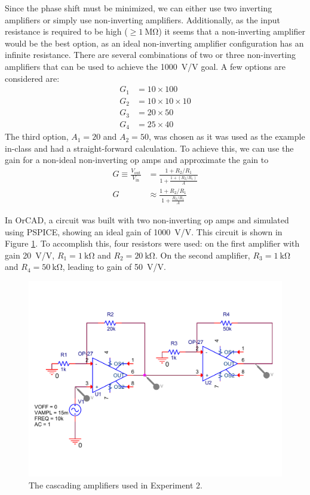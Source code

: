 \documentclass{report}
\begin{document}
	Since the phase shift must be minimized, we can either use two inverting amplifiers or simply use non-inverting amplifiers. Additionally, as the input resistance is required to be high ($\ge \SI{1}{\Mohm}$) it seems that a non-inverting amplifier would be the best option, as an ideal non-inverting amplifier configuration has an infinite resistance. There are several combinations of two or three non-inverting amplifiers that can be used to achieve the \SI{1000}{\V/\V} goal. A few options are considered are: \begin{align*}
		G_1 & = 10 \times 100 \\
		G_2 & = 10 \times 10 \times 10 \\
		G_3 & = 20 \times 50 \\
		G_4 & = 25 \times 40
	\end{align*}
	The third option, $A_1 = 20$ and $A_2 = 50$, was chosen as it was used as the example in-class and had a straight-forward calculation. To achieve this, we can use the gain for a non-ideal non-inverting op amps and approximate the gain to
	\begin{subequations}
		\begin{align}
			G \equiv \frac{V_\mathrm{out}}{V_\mathrm{in}} & = \frac{1 + R_2 / R_1}{1 + \frac{1 + (R_2 / R_1)}{A}} \\
			G & \approx \frac{1 + R_2 / R_1}{1 + \frac{R_2 / R_1}{A}} \label{eq:exp2gain}
		\end{align}
	\end{subequations}

	In OrCAD, a circuit was built with two non-inverting op amps and simulated using PSPICE, showing an ideal gain of \SI{1000}{\V/\V}. This circuit is shown in Figure \ref{fig:exp2orcad}. To accomplish this, four resistors were used: on the first amplifier with gain \SI{20}{\V/\V}, $R_1=\SI{1}{\kohm}$ and $R_2=\SI{20}{\kohm}$. On the second amplifier, $R_3=\SI{1}{\kohm}$ and $R_4=\SI{50}{\kohm}$, leading to gain of \SI{50}{\V/\V}.
	
	\begin{figure}[h]
		\centering
		\includegraphics[width=0.7\linewidth, trim=0 80 0 80, clip]{exp2orcad}
		\caption{The cascading amplifiers used in Experiment 2.}
		\label{fig:exp2orcad}
	\end{figure}
	
\end{document}
